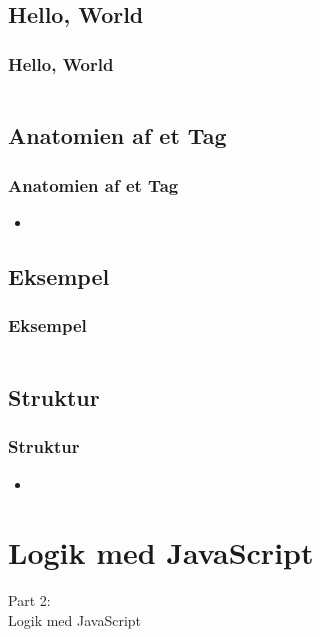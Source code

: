 \subsection{Hello, World}
\begin{frame}
    \frametitle{Hello, World}
    \inputminted{html}{../src/frontend/iteration1_html_hello/index.html}
\end{frame}

\subsection{Anatomien af et Tag}
\begin{frame}
    \frametitle{Anatomien af et Tag}
    \begin{itemize}
      \item 
    \end{itemize}
\end{frame}

\subsection{Eksempel}
\begin{frame}
    \frametitle{Eksempel}
    \inputminted[breaklines=true]{html}{../src/frontend/iteration1_html/index.html}
\end{frame}

\subsection{Struktur}
\begin{frame}
    \frametitle{Struktur}
    \begin{itemize}
      \item 
    \end{itemize}
\end{frame}

\section{Logik med JavaScript}
\begin{frame}
    \vspace{25mm}
    \begin{center}
        \Huge{Part 2:\\Logik med JavaScript}
    \end{center}
\end{frame}

